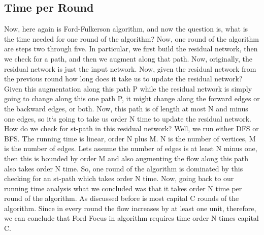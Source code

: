 \subsection{Time per Round}
Now, here again is Ford-Fulkerson algorithm, and now the question is, what is the time needed for one round of the algorithm? Now, one round of the algorithm are steps two through five.
In particular, we first build the residual network, then we check for a path, and then we augment along that path.
Now, originally, the residual network is just the input network.
Now, given the residual network from the previous round how long does it take us to update the residual network? Given this augmentation along this path P while the residual network is simply going to change along this one path P, it might change along the forward edges or the backward edges, or both.
Now, this path is of length at most N and minus one edges, so it`s going to take us order N time to update the residual network.
How do we check for st-path in this residual network? Well, we run either DFS or BFS\@.
The running time is linear, order N plus M\@.
N is the number of vertices, M is the number of edges.
Lets assume the number of edges is at least N minus one, then this is bounded by order M and also augmenting the flow along this path also takes order N time.
So, one round of the algorithm is dominated by this checking for an st-path which takes order N time.
Now, going back to our running time analysis what we concluded was that it takes order N time per round of the algorithm.
As discussed before is most capital C rounds of the algorithm.
Since in every round the flow increases by at least one unit, therefore, we can conclude that Ford Focus in algorithm requires time order N times capital C\@.

